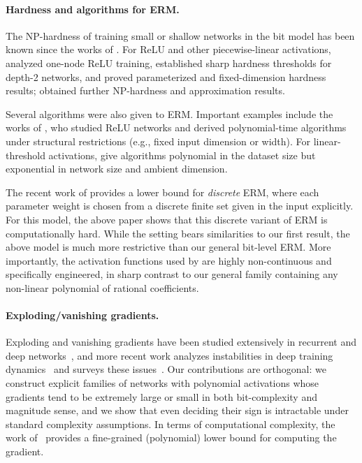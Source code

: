\documentclass{article}
\theoremstyle{plain}
\theoremstyle{definition}
\theoremstyle{remark}
\begin{document}
\paragraph{Hardness and algorithms for ERM.}

The NP-hardness of training small or shallow networks in the bit model has been known since the works of \cite{judd1988complexity,blum1988training,vsima2002training}. For ReLU and other piecewise-linear activations, \cite{dey20} analyzed one-node ReLU training, \cite{Goel21} established sharp hardness thresholds for depth-2 networks, and \cite{Froese22,Froese2024,froese2022computational} proved parameterized and fixed-dimension hardness results; \cite{Boob22} obtained further NP-hardness and approximation results. 

Several algorithms were also given to ERM. Important examples include the works of \cite{AroraBMM18,PilanciE20,ergen2021convex,ergen2021global}, who studied ReLU networks and derived polynomial-time algorithms under structural restrictions (e.g., fixed input dimension or width). For linear-threshold activations, \cite{khalife2024neural} give algorithms polynomial in the dataset size but exponential in network size and ambient dimension.


The recent work of \cite{doron2025hardness} provides a lower bound for {\em discrete} ERM, where each parameter weight is chosen from a discrete finite set given in the input explicitly. For this model, the above paper shows that this discrete variant of ERM is computationally hard. 
While the setting bears similarities to our first result, the above model is much more restrictive than our general bit-level ERM. More importantly, the activation functions used by \cite{doron2025hardness} are highly non-continuous and specifically engineered, in sharp contrast to our general family containing any non-linear polynomial of rational coefficients. 


\paragraph{Exploding/vanishing gradients.}
Exploding and vanishing gradients have been studied extensively in recurrent and deep networks~\cite{hochreiter1991untersuchungen,hochreiter1998vanishing,bengio1994learning,glorot2010understanding,pascanu2013difficulty}, and more recent work analyzes instabilities in deep training dynamics~\cite{sun2022surprising} and surveys these issues~\cite{DBLP:books/daglib/0040158}. Our contributions are orthogonal: we construct explicit families of networks with polynomial activations whose gradients tend to be extremely large or small in both bit-complexity and magnitude sense, and we show that even deciding their sign is intractable under standard complexity assumptions. In terms of computational complexity, the work of~\cite{backurs2017fine} provides a fine-grained (polynomial) lower bound for computing the gradient. 
\end{document}

